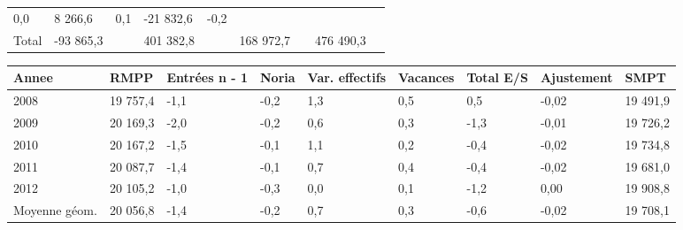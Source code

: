 \begin{longtable}[]{@{}lllllllll@{}}
\begin{minipage}[t]{0.06\columnwidth}
0,0\strut
\end{minipage} & \begin{minipage}[t]{0.12\columnwidth}\raggedright
8 266,6\strut
\end{minipage} & \begin{minipage}[t]{0.06\columnwidth}\raggedright
0,1\strut
\end{minipage} & \begin{minipage}[t]{0.08\columnwidth}\raggedright
-21 832,6\strut
\end{minipage} & \begin{minipage}[t]{0.06\columnwidth}\raggedright
-0,2\strut
\end{minipage}\tabularnewline
\begin{minipage}[t]{0.05\columnwidth}\raggedright
Total\strut
\end{minipage} & \begin{minipage}[t]{0.10\columnwidth}\raggedright
-93 865,3\strut
\end{minipage} & \begin{minipage}[t]{0.06\columnwidth}\raggedright
\strut
\end{minipage} & \begin{minipage}[t]{0.17\columnwidth}\raggedright
401 382,8\strut
\end{minipage} & \begin{minipage}[t]{0.06\columnwidth}\raggedright
\strut
\end{minipage} & \begin{minipage}[t]{0.12\columnwidth}\raggedright
168 972,7\strut
\end{minipage} & \begin{minipage}[t]{0.06\columnwidth}\raggedright
\strut
\end{minipage} & \begin{minipage}[t]{0.08\columnwidth}\raggedright
476 490,3\strut
\end{minipage} & \begin{minipage}[t]{0.06\columnwidth}\raggedright
\strut
\end{minipage}\tabularnewline
\bottomrule
\end{longtable}

\begin{longtable}[]{@{}lllllllll@{}}
\toprule
Annee & RMPP & Entrées n - 1 & Noria & Var. effectifs & Vacances & Total
E/S & Ajustement & SMPT\tabularnewline
\midrule
\endhead
2008 & 19 757,4 & -1,1 & -0,2 & 1,3 & 0,5 & 0,5 & -0,02 & 19
491,9\tabularnewline
2009 & 20 169,3 & -2,0 & -0,2 & 0,6 & 0,3 & -1,3 & -0,01 & 19
726,2\tabularnewline
2010 & 20 167,2 & -1,5 & -0,1 & 1,1 & 0,2 & -0,4 & -0,02 & 19
734,8\tabularnewline
2011 & 20 087,7 & -1,4 & -0,1 & 0,7 & 0,4 & -0,4 & -0,02 & 19
681,0\tabularnewline
2012 & 20 105,2 & -1,0 & -0,3 & 0,0 & 0,1 & -1,2 & 0,00 & 19
908,8\tabularnewline
Moyenne géom. & 20 056,8 & -1,4 & -0,2 & 0,7 & 0,3 & -0,6 & -0,02 & 19
708,1\tabularnewline
\bottomrule
\end{longtable}

